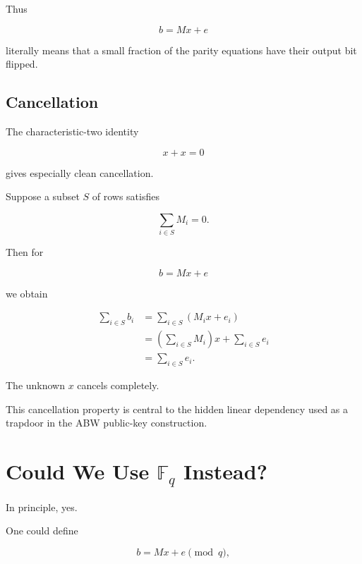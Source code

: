 \documentclass[11pt,a4paper]{article}
\newcommand{\F}{\mathbb{F}}
\begin{document}
Thus

\begin{equation}
    b=Mx+e
\end{equation}

literally means that a small fraction of the parity equations have
their output bit flipped.

\subsection{Cancellation}

The characteristic-two identity

\begin{equation}
    x+x=0
\end{equation}

gives especially clean cancellation.

Suppose a subset $S$ of rows satisfies

\begin{equation}
    \sum_{i\in S}M_i=0.
\end{equation}

Then for

\begin{equation}
    b=Mx+e
\end{equation}

we obtain

\begin{align}
\sum_{i\in S}b_i
&=
\sum_{i\in S}(M_ix+e_i)\\
&=
\left(\sum_{i\in S}M_i\right)x
+
\sum_{i\in S}e_i\\
&=
\sum_{i\in S}e_i.
\end{align}

The unknown $x$ cancels completely.

This cancellation property is central to the hidden linear dependency
used as a trapdoor in the ABW public-key construction.

\section{Could We Use \texorpdfstring{$\F_q$}{Fq} Instead?}

In principle, yes.

One could define

\begin{equation}
    b=Mx+e\pmod q,
\end{equation}
\end{document}
